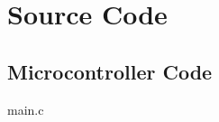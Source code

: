 \chapter{Source Code}
\newenvironment{longlisting}{\captionsetup{type=listing}}{}
\section{Microcontroller Code}
\begin{longlisting}
	\caption{main.c}
	\label{lst:main.c}
	\inputminted[bgcolor=LightGray,fontsize=\footnotesize,linenos,breaklines]{c}{Figures/appendix/mcu/main.c}
\end{longlisting}

